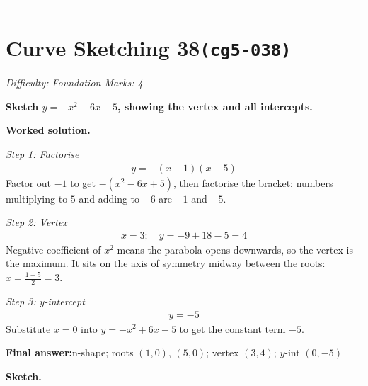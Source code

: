 \documentclass[11pt]{article}
\newcommand{\question}[1]{\par\medskip\noindent\textbf{#1}\par}
\begin{document}
\medskip\hrule

\section*{Curve Sketching 38\quad\small\texttt{(cg5-038)}}
\textit{Difficulty: Foundation \quad\textbar\quad Marks: 4}

\question{Sketch \( y = -x^2 + 6x - 5 \), showing the vertex and all intercepts.}

\textbf{Worked solution.}

\textit{Step 1: Factorise}
\[\begin{gathered}
y = -(x-1)(x-5)
\end{gathered}\]
Factor out \(-1\) to get \( -(x^2 - 6x + 5) \), then factorise the bracket: numbers multiplying to \(5\) and adding to \(-6\) are \(-1\) and \(-5\).

\textit{Step 2: Vertex}
\[\begin{gathered}
x = 3; \quad y = -9 + 18 - 5 = 4
\end{gathered}\]
Negative coefficient of \( x^2 \) means the parabola opens downwards, so the vertex is the maximum. It sits on the axis of symmetry midway between the roots: \( x = \tfrac{1+5}{2} = 3 \).

\textit{Step 3: y-intercept}
\[\begin{gathered}
y = -5
\end{gathered}\]
Substitute \( x = 0 \) into \( y = -x^2 + 6x - 5 \) to get the constant term \(-5\).

\begin{answerbox}
\textbf{Final answer:}\quad n-shape; roots \(\displaystyle (1,0)\), \(\displaystyle (5,0)\); vertex \(\displaystyle (3,4)\); \(\displaystyle y\)-int \(\displaystyle (0,-5)\)
\end{answerbox}
\textbf{Sketch.}
\end{document}
